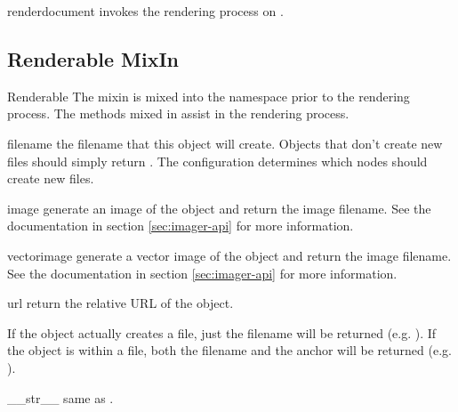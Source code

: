 \begin{methoddesc}[Renderer]{render}{document}
invokes the rendering process on .
\end{methoddesc}


\subsection{Renderable MixIn}

\begin{classdesc}{Renderable}{}
The  mixin is mixed into the  namespace
prior to the rendering process.  The methods mixed in assist in the 
rendering process.
\end{classdesc}

\begin{memberdesc}[Renderable]{filename}
the filename that this object will create.  Objects that don't create 
new files should simply return .   The configuration determines
which nodes should create new files. 
\end{memberdesc}

\begin{memberdesc}[Renderable]{image}
generate an image of the object and return the image filename.  See
the  documentation in section \ref{sec:imager-api} for
more information.
\end{memberdesc}

\begin{memberdesc}[Renderable]{vectorimage}
generate a vector image of the object and return the image filename.  See
the  documentation in section \ref{sec:imager-api} for
more information.
\end{memberdesc}

\begin{memberdesc}[Renderable]{url}
return the relative URL of the object.  

If the object actually creates a file, just the filename will
be returned (e.g. ).  If the object is within a file, 
both the filename and the anchor will be returned 
(e.g. ).
\end{memberdesc}


\begin{methoddesc}[Renderable]{__str__}{}
same as .
\end{methoddesc}

